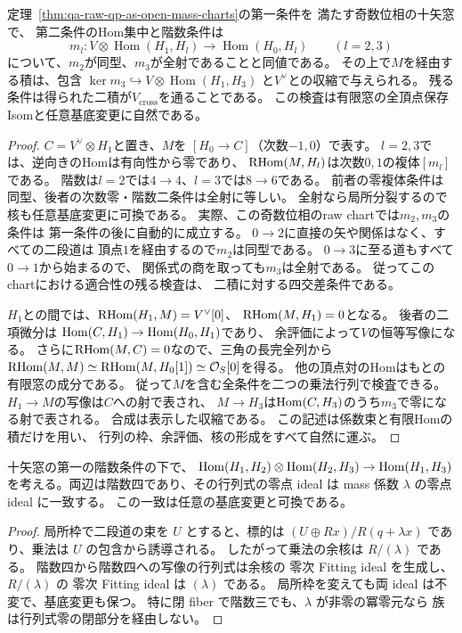 \begin{corollary}[逆mutationの二つの乗法行列]
\label{cor:qa-inverse-mutation-multiplication-matrices}
定理~\ref{thm:qa-raw-qp-as-open-mass-charts}の第一条件を
満たす奇数位相の十矢窓で、
第二条件のHom集中と階数条件は
\[
 m_l:V\otimes\operatorname{Hom}(H_1,H_l)
           \longrightarrow\operatorname{Hom}(H_0,H_l)
 \qquad(l=2,3)
\]
について、$m_2$が同型、$m_3$が全射であることと同値である。
その上で$M$を経由する積は、包含
$\ker m_3\hookrightarrow V\otimes\operatorname{Hom}(H_1,H_3)$
と$V^\vee$との収縮で与えられる。
残る条件は得られた二積が$V_{\mathrm{cross}}$を通ることである。
この検査は有限窓の全頂点保存Isomと任意基底変更に自然である。
\end{corollary}
\begin{proof}
$C=V^\vee\otimes H_1$と置き、$M$を
$[H_0\to C]$（次数$-1,0$）で表す。
$l=2,3$では、逆向きのHomは有向性から零であり、
$\operatorname{RHom}(M,H_l)$は次数$0,1$の複体$[m_l]$である。
階数は$l=2$では$4\to4$、$l=3$では$8\to6$である。
前者の零複体条件は同型、後者の次数零・階数二条件は全射に等しい。
全射なら局所分裂するので核も任意基底変更に可換である。
実際、この奇数位相のraw chartでは$m_2,m_3$の条件は
第一条件の後に自動的に成立する。
$0\to2$に直接の矢や関係はなく、すべての二段道は
頂点$1$を経由するので$m_2$は同型である。
$0\to3$に至る道もすべて$0\to1$から始まるので、
関係式の商を取っても$m_3$は全射である。
従ってこのchartにおける適合性の残る検査は、
二積に対する四交差条件である。

$H_1$との間では、$\operatorname{RHom}(H_1,M)=V^\vee[0]$、
$\operatorname{RHom}(M,H_1)=0$となる。
後者の二項微分は
$\operatorname{Hom}(C,H_1)\to\operatorname{Hom}(H_0,H_1)$であり、
余評価によって$V$の恒等写像になる。
さらに$\operatorname{RHom}(M,C)=0$なので、三角の長完全列から
$\operatorname{RHom}(M,M)\simeq\operatorname{RHom}(M,H_0[1])\simeq\mathcal O_S[0]$を得る。
他の頂点対のHomはもとの有限窓の成分である。
従って$M$を含む全条件を二つの乗法行列で検査できる。
$H_1\to M$の写像は$C$への射で表され、
$M\to H_3$は$\operatorname{Hom}(C,H_3)$のうち$m_3$で零になる射で表される。
合成は表示した収縮である。
この記述は係数束と有限Homの積だけを用い、
行列の枠、余評価、核の形成をすべて自然に運ぶ。
\end{proof}

\begin{corollary}[十矢表示の短い乗法の行列式壁]
十矢窓の第一の階数条件の下で、
$\operatorname{Hom}(H_1,H_2)\otimes\operatorname{Hom}(H_2,H_3)\to\operatorname{Hom}(H_1,H_3)$
を考える。両辺は階数四であり、その行列式の零点 ideal は
mass 係数 $\lambda$ の零点 ideal に一致する。
この一致は任意の基底変更と可換である。
\end{corollary}
\begin{proof}
局所枠で二段道の束を $U$ とすると、標的は
$(U\oplus Rx)/R(q+\lambda x)$ であり、乗法は $U$ の包含から誘導される。
したがって乗法の余核は $R/(\lambda)$ である。
階数四から階数四への写像の行列式は余核の
零次 Fitting ideal を生成し、$R/(\lambda)$ の
零次 Fitting ideal は $(\lambda)$ である。
局所枠を変えても両 ideal は不変で、基底変更も保つ。
特に閉 fiber で階数三でも、$\lambda$ が非零の冪零元なら
族は行列式零の閉部分を経由しない。
\end{proof}

